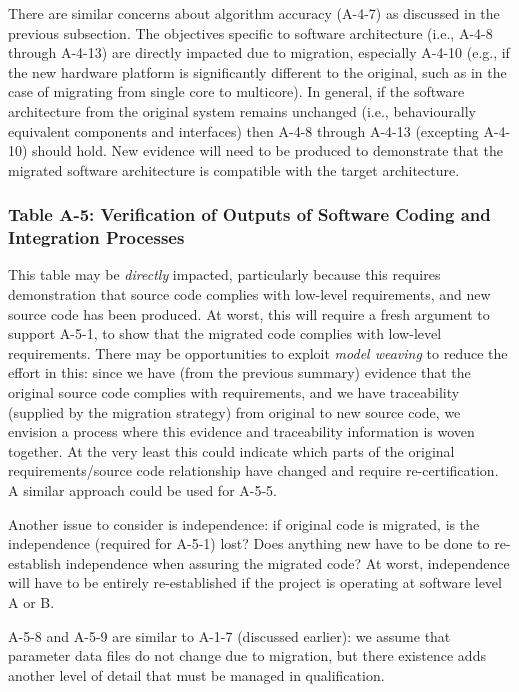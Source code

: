 \documentclass{llncs}
\begin{document}
There are similar concerns about algorithm accuracy (A-4-7) as discussed in the previous subsection. The objectives specific to software architecture (i.e., A-4-8 through A-4-13) are directly impacted due to migration, especially A-4-10 (e.g., if the new hardware platform is significantly different to the original, such as in the case of migrating from single core to multicore). In general, if the software architecture from the original system remains unchanged (i.e., behaviourally equivalent components and interfaces) then A-4-8 through A-4-13 (excepting A-4-10) should hold. New evidence will need to be produced to demonstrate that the migrated software architecture is compatible with the target architecture.

\subsubsection{Table A-5: Verification of Outputs of Software Coding and Integration Processes}
\label{sec:a-5}
This table may be \textit{directly} impacted, particularly because this requires demonstration that source code complies with low-level requirements, and new source code has been produced. At worst, this will require a fresh argument to support A-5-1, to show that the migrated code complies with low-level requirements. There may be opportunities to exploit \textit{model weaving} to reduce the effort in this: since we have (from the previous summary) evidence that the original source code complies with requirements, and we have traceability (supplied by the migration strategy) from original to new source code, we envision a process where this evidence and traceability information is woven together. At the very least this could indicate which parts of the original requirements/source code relationship have changed and require re-certification. A similar approach could be used for A-5-5. 

Another issue to consider is independence: if original code is migrated, is the independence (required for A-5-1) lost? Does anything new have to be done to re-establish independence when assuring the migrated code? At worst, independence will have to be entirely re-established if the project is operating at software level A or B.

A-5-8 and A-5-9 are similar to A-1-7 (discussed earlier): we assume that parameter data files do not change due to migration, but there existence adds another level of detail that must be managed in qualification.
\end{document}
